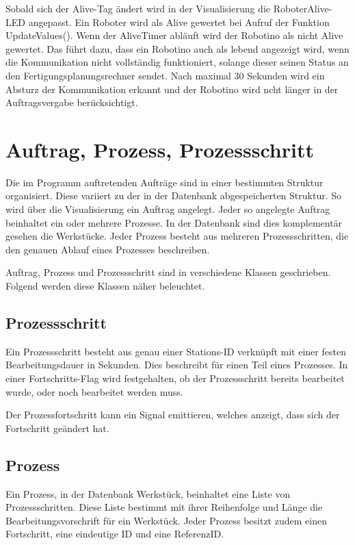 Sobald sich der Alive-Tag ändert wird in der Visualisierung die RoboterAlive-LED angepasst. Ein Roboter wird als Alive gewertet bei Aufruf der Funktion UpdateValues(). Wenn der AliveTimer abläuft wird der Robotino als nicht Alive gewertet. Das führt dazu, dass ein Robotino auch als lebend angezeigt wird, wenn die Kommunikation nicht vollständig funktioniert, solange dieser seinen Status an den Fertigungsplanungsrechner sendet. Nach maximal 30 Sekunden wird ein Absturz der Kommunikation erkannt und der Robotino wird ncht länger in der Auftragsvergabe berücksichtigt. 

\section{Auftrag, Prozess, Prozessschritt} 
\label{sec:AuftragProzessSchritt}

Die im Programm auftretenden Aufträge sind in einer bestimmten Struktur organisiert. Diese variiert zu der in der Datenbank abgespeicherten Struktur. So wird über die Visualisierung ein Auftrag angelegt. Jeder so angelegte \Gls{Auftrag} beinhaltet ein oder mehrere Prozesse. In der Datenbank sind dies komplementär gesehen die Werkstücke. Jeder \Gls{Prozess} besteht aus mehreren Prozessschritten, die den genauen Ablauf eines Prozesses beschreiben. 

Auftrag, Prozess und Prozessschritt sind in verschiedene Klassen geschrieben. Folgend werden diese Klassen näher beleuchtet. 

\subsection{Prozessschritt}
\label{sec:Prozessschritt}

Ein \Gls{Prozessschritt} besteht aus genau einer Stations-ID verknüpft mit einer festen Bearbeitungsdauer in Sekunden. Dies beschreibt für einen Teil eines Prozesses. In einer Fortschritts-Flag wird festgehalten, ob der Prozessschritt bereits bearbeitet wurde, oder noch bearbeitet werden muss. 

Der Prozessfortschritt kann ein Signal emittieren, welches anzeigt, dass sich der Fortschritt geändert hat.

\subsection{Prozess}
\label{sec:Prozess}

Ein Prozess, in der Datenbank Werkstück, beinhaltet eine Liste von Prozessschritten. Diese Liste bestimmt mit ihrer Reihenfolge und Länge die Bearbeitungsvorschrift für ein Werkstück. Jeder Prozess besitzt zudem einen Fortschritt, eine eindeutige ID und eine ReferenzID. 

